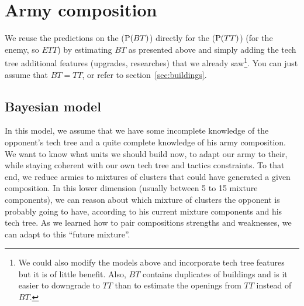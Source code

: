 \section{Army composition}
We reuse the predictions on the  ($\mathrm{P}(BT)$) directly for the  ($\mathrm{P}(TT)$) (for the enemy, so $ETT$) by estimating $BT$ as presented above and simply adding the tech tree additional features (upgrades, researches) that we already saw\footnote{We could also modify the models above and incorporate tech tree features but it is of little benefit. Also, $BT$ contains duplicates of buildings and is it easier to downgrade to $TT$ than to estimate the openings from $TT$ instead of $BT$.}. You can just assume that $BT=TT$, or refer to section~\ref{sec:buildings}.

\subsection{Bayesian model}

In this model, we assume that we have some incomplete knowledge of the opponent's tech tree and a quite complete knowledge of his army composition. We want to know what units we should build now, to adapt our army to their, while staying coherent with our own tech tree and tactics constraints. To that end, we reduce armies to mixtures of clusters that could have generated a given composition. In this lower dimension (usually between 5 to 15 mixture components), %
we can reason about which mixture of clusters the opponent is probably going to have, according to his current mixture components and his tech tree. As we learned how to pair compositions strengths and weaknesses, we can adapt to this ``future mixture''. %

